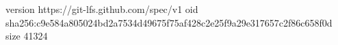 version https://git-lfs.github.com/spec/v1
oid sha256:c9e584a805024bd2a7534d49675f75af428c2e25f9a29e317657c2f86c658f0d
size 41324
